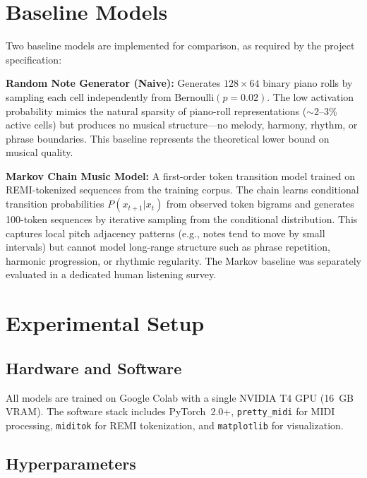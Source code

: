 \documentclass[conference]{IEEEtran}
\begin{document}
\section{Baseline Models}

Two baseline models are implemented for comparison, as required by the project specification:

\textbf{Random Note Generator (Naive):} Generates $128 \times 64$ binary piano rolls by sampling each cell independently from $\text{Bernoulli}(p=0.02)$. The low activation probability mimics the natural sparsity of piano-roll representations ($\sim$2--3\% active cells) but produces no musical structure---no melody, harmony, rhythm, or phrase boundaries. This baseline represents the theoretical lower bound on musical quality.

\textbf{Markov Chain Music Model:} A first-order token transition model trained on REMI-tokenized sequences from the training corpus. The chain learns conditional transition probabilities $P(x_{t+1} | x_t)$ from observed token bigrams and generates 100-token sequences by iterative sampling from the conditional distribution. This captures local pitch adjacency patterns (e.g., notes tend to move by small intervals) but cannot model long-range structure such as phrase repetition, harmonic progression, or rhythmic regularity. The Markov baseline was separately evaluated in a dedicated human listening survey.

\section{Experimental Setup}

\subsection{Hardware and Software}

All models are trained on Google Colab with a single NVIDIA T4 GPU (16~GB VRAM). The software stack includes PyTorch~2.0+, \texttt{pretty\_midi} for MIDI processing, \texttt{miditok} for REMI tokenization, and \texttt{matplotlib} for visualization.

\subsection{Hyperparameters}
\end{document}
